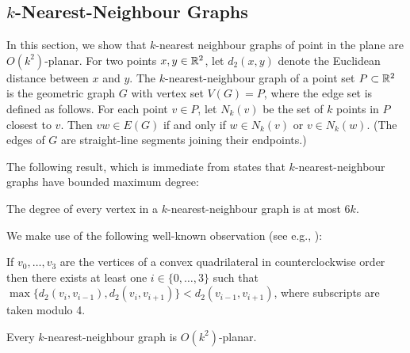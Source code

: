\documentclass{patmorin}
\renewcommand{\le}{\leqslant}
\begin{document}
\subsection{$k$-Nearest-Neighbour Graphs}

In this section, we show that $k$-nearest neighbour graphs of point in the plane are $O(k^2)$-planar.  For two points $x,y\in\mathbb{R}^2$, let $d_2(x,y)$ denote the Euclidean distance between $x$ and $y$. The $k$-nearest-neighbour graph of a point set $P\subset\mathbb{R}^2$ is the geometric graph $G$ with vertex set $V(G)=P$, where the edge set is defined as follows. For each point $v\in P$, let $N_k(v)$ be the set of $k$ points in $P$ closest to $v$. Then $vw\in E(G)$ if and only if $w\in N_k(v)$ or $v\in N_k(w)$. 
(The edges of $G$ are straight-line segments joining their endpoints.)

The following result, which is immediate from \citet[Corollary~4.2.6]{abrego.munroy.ea:on} states that $k$-nearest-neighbour graphs have bounded maximum degree:
\begin{lem}
\label{k-nn-max-degree}
The degree of every vertex in a $k$-nearest-neighbour graph is at most $6k$.
\end{lem}

We make use of the following well-known observation (see e.g., \citet[Lemma~2]{bose.morin.ea:routing}):
\begin{obs}
\label{convex}
If $v_0,\ldots,v_3$ are the vertices of a convex quadrilateral in counterclockwise order then there exists at least one $i\in\{0,\ldots,3\}$ such that $\max\{d_2(v_i,v_{i-1}), d_2(v_i,v_{i+1})\} < d_2(v_{i-1},v_{i+1})$, where subscripts are taken modulo 4.
\end{obs}

\begin{lem}
\label{nearest-neighbour}
  Every $k$-nearest-neighbour graph is $O(k^2)$-planar.
\end{lem}
\end{document}

